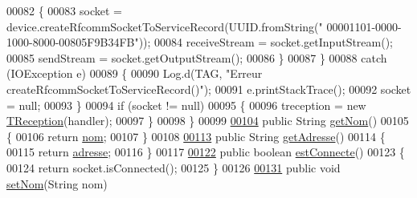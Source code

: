 \begin{DoxyCode}
00082             \{
00083                 socket = device.createRfcommSocketToServiceRecord(UUID.fromString(\textcolor{stringliteral}{"
      00001101-0000-1000-8000-00805F9B34FB"}));
00084                 receiveStream = socket.getInputStream();
00085                 sendStream = socket.getOutputStream();
00086             \}
00087         \}
00088         \textcolor{keywordflow}{catch} (IOException e)
00089         \{
00090             Log.d(TAG, \textcolor{stringliteral}{"Erreur createRfcommSocketToServiceRecord()"});
00091             e.printStackTrace();
00092             socket = null;
00093         \}
00094         \textcolor{keywordflow}{if} (socket != null)
00095         \{
00096             treception = \textcolor{keyword}{new} \hyperlink{classcom_1_1lasalle_1_1io__trucks_1_1_peripherique_1_1_t_reception}{TReception}(handler);
00097         \}
00098     \}
00099 
\hyperlink{classcom_1_1lasalle_1_1io__trucks_1_1_peripherique_abb25c792075ebe58d52419c84004c258}{00104}     \textcolor{keyword}{public} String \hyperlink{classcom_1_1lasalle_1_1io__trucks_1_1_peripherique_abb25c792075ebe58d52419c84004c258}{getNom}()
00105     \{
00106         \textcolor{keywordflow}{return} \hyperlink{classcom_1_1lasalle_1_1io__trucks_1_1_peripherique_a57ad735952307998eddf5277be95ec95}{nom};
00107     \}
00108 
\hyperlink{classcom_1_1lasalle_1_1io__trucks_1_1_peripherique_a4c8533394dd5322a31b7d09d17bfc796}{00113}     \textcolor{keyword}{public} String \hyperlink{classcom_1_1lasalle_1_1io__trucks_1_1_peripherique_a4c8533394dd5322a31b7d09d17bfc796}{getAdresse}()
00114     \{
00115         \textcolor{keywordflow}{return} \hyperlink{classcom_1_1lasalle_1_1io__trucks_1_1_peripherique_a0f0c207b12d3aded58623cfe0f9cd6d2}{adresse};
00116     \}
00117 
\hyperlink{classcom_1_1lasalle_1_1io__trucks_1_1_peripherique_a53878a13cdb7b3d8fa8e7c97cb0287f0}{00122}     \textcolor{keyword}{public} \textcolor{keywordtype}{boolean} \hyperlink{classcom_1_1lasalle_1_1io__trucks_1_1_peripherique_a53878a13cdb7b3d8fa8e7c97cb0287f0}{estConnecte}()
00123     \{
00124         \textcolor{keywordflow}{return} socket.isConnected();
00125     \}
00126 
\hyperlink{classcom_1_1lasalle_1_1io__trucks_1_1_peripherique_a1e61a36e2fb0d3665f1dcc41e5ea06b2}{00131}     \textcolor{keyword}{public} \textcolor{keywordtype}{void} \hyperlink{classcom_1_1lasalle_1_1io__trucks_1_1_peripherique_a1e61a36e2fb0d3665f1dcc41e5ea06b2}{setNom}(String nom)

\end{DoxyCode}

